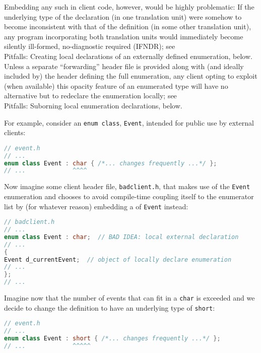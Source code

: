 Embedding any such  in client code, however,
would be highly problematic: If the underlying type of the declaration
(in one translation unit) were somehow to become inconsistent with that
of the definition (in some other translation unit), any program
incorporating both translation units would immediately become silently
ill-formed, no-diagnostic required (IFNDR); see \\
Pitfalls: Creating local declarations of an externally defined enumeration, below.\\
Unless a separate ``forwarding'' header file is
provided along with (and ideally included by) the header defining the
full enumeration, any client opting to exploit (when available) this
opacity feature of an enumerated type will have no alternative but to
redeclare the enumeration locally; see \\
Pitfalls: Suborning local enumeration declarations, below.

For example, consider an \lstinline!enum!~\lstinline!class!, \lstinline!Event!,
intended for public use by external clients:

\begin{lstlisting}[language=C++]
// event.h
// ...
enum class Event : char { /*... changes frequently ...*/ };
// ...             ^^^^
\end{lstlisting}

\noindent Now imagine some client header file, \lstinline!badclient.h!, that makes
use of the \lstinline!Event! enumeration and chooses to avoid compile-time
coupling itself to the enumerator list by (for whatever reason)
embedding a  of \lstinline!Event! instead:

\begin{lstlisting}[language=C++]
// badclient.h
// ...
enum class Event : char;  // BAD IDEA: local external declaration
// ...
{
Event d_currentEvent;  // object of locally declare enumeration
// ...
};
// ...
\end{lstlisting}

\noindent Imagine now that the number of events that can fit in a \lstinline!char! is
exceeded and we decide to change the definition to have an underlying
type of \lstinline!short!:

\begin{lstlisting}[language=C++]
// event.h
// ...
enum class Event : short { /*... changes frequently ...*/ };
// ...             ^^^^^
\end{lstlisting}

